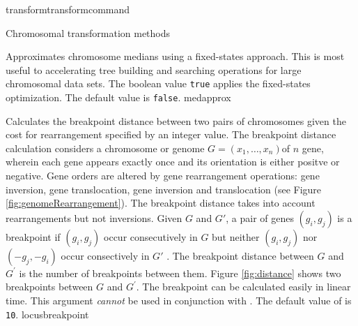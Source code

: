 \begin{command}{transform}{transformcommand}
\begin{arguments}
\begin{argumentgroup}{Chromosomal transformation methods}
	\begin{description}
            
                        {Approximates chromosome medians using a fixed-states
                        approach. This is most useful to accelerating tree
                        building and searching operations for large chromosomal
                        data sets. The boolean value \texttt{true} applies the
                        fixed-states optimization. The default value is
                        \texttt{false}.}
                        {medapprox}
                        
                        {Calculates the breakpoint distance \cite{blanchetteetal1997}
                        between two pairs of chromosomes given the cost for rearrangement
                        specified by an integer value.  The breakpoint distance calculation considers
                        a chromosome or genome $G = (x_1, \ldots, x_n)$of $n$ gene, wherein each
                        gene appears exactly once and its orientation is either positve or negative.  Gene
                        orders are altered by gene rearrangement operations: gene inversion, gene translocation,
                        gene inversion and translocation (see Figure \ref{fig:genomeRearrangement}).  
                        The breakpoint distance takes into account rearrangements but not inversions.
                        Given $G$ and $G'$, a pair of genes $(g_i, g_j)$ is a breakpoint if $(g_i, g_j)$ occur 
                        consecutively in $G$ but neither $(g_i, g_j)$ nor $(-g_j, -g_i)$ occur
                        consectively in $G'$  \cite{sankoffandblanchette1998}.  The breakpoint distance between $G$
		     and $G^\prime$ is the number of breakpoints between them.  Figure \ref{fig:distance} 
                        shows two breakpoints between $G$ and $G^\prime$. The breakpoint can be calculated 
                        easily in linear time.  This argument \emph{cannot} be used in
                        conjunction with . The default
                        value of  is \texttt{10}.} 
                        {locusbreakpoint} 
                        

\end{description}
\end{argumentgroup}
\end{arguments}
\end{command}
